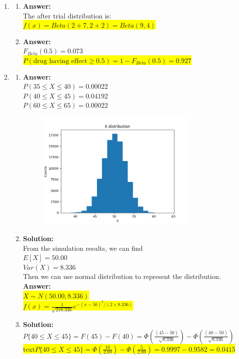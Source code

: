 \documentclass{article}
\newcommand{\myansw}{\textbf{Answer:}\\}
\newcommand{\mysolu}{\textbf{Solution:}\\}
\begin{document}
\thispagestyle{fancy} %

\begin{enumerate}
	\item
	\begin{enumerate}
		\item
		\myansw
		The after trial distribution is:\\
		\colorbox{yellow}{${f(x) = Beta(2+7, 2+2)  = Beta(9,4)}$}\\
		\item
		\myansw
		${F_{Beta}(0.5) = 0.073}$\\
		\colorbox{yellow}{${P(\text{drug having effect} \geq 0.5) = 1 - F_{Beta}(0.5) = 0.927}$}\\
		
	
		
	\end{enumerate}
	\item
	\begin{enumerate}
		\item
		\myansw
		${P(35 \leq X \leq 40) = 0.00022}$\\
		${P(40 \leq X \leq 45) = 0.04192}$\\
		${P(60 \leq X \leq 65) = 0.00022}$\\
		
		\begin{figure}[H]
			\centering
			\includegraphics[width=0.8\textwidth]{pset_5_2_a.png}
		\end{figure}
		\item
		\mysolu
		From the simulation results, we can find\\
		${E[X] = 50.00}$\\
		${Var(X) = 8.336}$\\
		Then we can use normal distribution to represent the distribution.\\
		\myansw
		\colorbox{yellow}{${X \sim N(50.00, 8.336)}$}\\
		\colorbox{yellow}{${f(x) = \frac{1}{\sqrt{2\pi8.336}}e^{-(x-50)^2/(2\times 8.336)}}$}\\
		\item
		\mysolu
		${P\{40 \leq X \leq 45\}= F(45) - F(40) =\Phi(\frac{(45 -50)}{\sqrt{8.336}}) -  \Phi(\frac{(40 -50)}{\sqrt{8.336}})}$\\
		\colorbox{yellow}{text${P\{40 \leq X \leq 45\}= \Phi(\frac{10}{2.89}) -  \Phi(\frac{5}{2.89}) = 0.9997 - 0.9582 = 0.0415}$}\\
		

\end{enumerate}
\end{enumerate}
\end{document}
